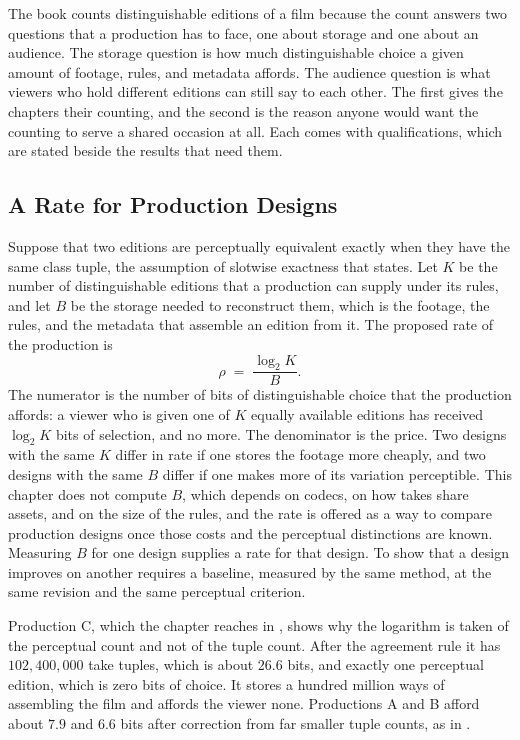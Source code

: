 \documentclass[11pt,twoside,openright]{book}
\theoremstyle{plain}
\theoremstyle{definition}
\theoremstyle{remark}
\begin{document}
The book counts distinguishable editions of a film because the count answers two questions that a production has to face, one about storage and one about an audience. The storage question is how much distinguishable choice a given amount of footage, rules, and metadata affords. The audience question is what viewers who hold different editions can still say to each other. The first gives the chapters their counting, and the second is the reason anyone would want the counting to serve a shared occasion at all. Each comes with qualifications, which are stated beside the results that need them.

\subsection{A Rate for Production Designs}

Suppose that two editions are perceptually equivalent exactly when they have the same class tuple, the assumption of slotwise exactness that  states. Let $K$ be the number of distinguishable editions that a production can supply under its rules, and let $B$ be the storage needed to reconstruct them, which is the footage, the rules, and the metadata that assemble an edition from it. The proposed rate of the production is
\[
\rho \;=\; \frac{\log_2 K}{B}.
\]
The numerator is the number of bits of distinguishable choice that the production affords: a viewer who is given one of $K$ equally available editions has received $\log_2K$ bits of selection, and no more. The denominator is the price. Two designs with the same $K$ differ in rate if one stores the footage more cheaply, and two designs with the same $B$ differ if one makes more of its variation perceptible. This chapter does not compute $B$, which depends on codecs, on how takes share assets, and on the size of the rules, and the rate is offered as a way to compare production designs once those costs and the perceptual distinctions are known. Measuring $B$ for one design supplies a rate for that design. To show that a design improves on another requires a baseline, measured by the same method, at the same revision and the same perceptual criterion.

Production C, which the chapter reaches in , shows why the logarithm is taken of the perceptual count and not of the tuple count. After the agreement rule it has $102{,}400{,}000$ take tuples, which is about $26.6$ bits, and exactly one perceptual edition, which is zero bits of choice. It stores a hundred million ways of assembling the film and affords the viewer none. Productions A and B afford about $7.9$ and $6.6$ bits after correction from far smaller tuple counts, as in .
\end{document}
